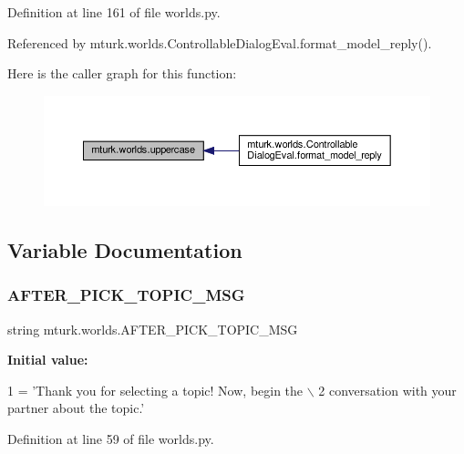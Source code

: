 Definition at line 161 of file worlds.\+py.



Referenced by mturk.\+worlds.\+Controllable\+Dialog\+Eval.\+format\+\_\+model\+\_\+reply().

Here is the caller graph for this function\+:
\nopagebreak
\begin{figure}[H]
\begin{center}
\leavevmode
\includegraphics[width=350pt]{namespacemturk_1_1worlds_ab708bf300fdd999b3a3d6bde99cf03c8_icgraph}
\end{center}
\end{figure}


\subsection{Variable Documentation}
\mbox{\label{namespacemturk_1_1worlds_a70cdda2581e97d7cfe62cb795f9ebf6f}} 
\subsubsection{\texorpdfstring{A\+F\+T\+E\+R\+\_\+\+P\+I\+C\+K\+\_\+\+T\+O\+P\+I\+C\+\_\+\+M\+SG}{AFTER\_PICK\_TOPIC\_MSG}}
{\footnotesize\ttfamily string mturk.\+worlds.\+A\+F\+T\+E\+R\+\_\+\+P\+I\+C\+K\+\_\+\+T\+O\+P\+I\+C\+\_\+\+M\+SG}

{\bfseries Initial value\+:}
\begin{DoxyCode}
1 =  \textcolor{stringliteral}{'Thank you for selecting a topic! Now, begin the \(\backslash\)}
2 \textcolor{stringliteral}{    conversation with your partner about the topic.'}
\end{DoxyCode}


Definition at line 59 of file worlds.\+py.

